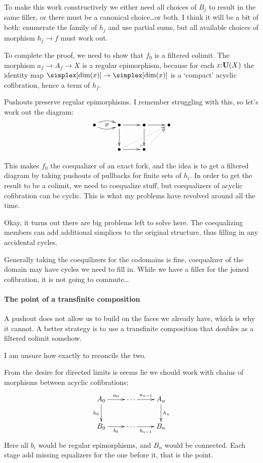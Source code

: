 \documentclass[csh.tex]{subfiles}
\makeatletter
\newcommand\pushout{\ar@{}[dr]|(.9)\ulcorner}
\makeatother
\begin{document}
To make this work constructively we either need all choices of $B_j$ to result in the same filler, or there must be a canonical choice\dots or both. I think it will be a bit of both: enumerate the family of $h_j$ and use partial sums, but all available choices of morphism $h_j\to f$ must work out.

To complete the proof, we need to show that $f_0$ is a filtered colimit. The morphism $a_f\to A_f\to X$ is a regular epimorphism, because for each $x\mathord :\mathbf{U}(X)$ the identity map $\simplex[\dim(x)]\to\simplex[\dim(x)]$ is a `compact' acyclic cofibration, hence a term of $h_f$.

Pushouts preserve regular epimorphisms. I remember struggling with this, so let's work out the diagram:
\[\xymatrix{
\bullet \ar@/^/[r]\ar@/_/[r]\ar@{}[r]|\varnothing & \bullet \ar[r]\ar[d]\pushout & \bullet \ar[r]\ar[d] & \bullet \\
& \bullet \ar[r]\ar@{.>}[urr] & \bullet \ar@{.>}[ur]
}\]

This makes $f_0$ the coequalizer of an exact fork, and the idea is to get a filtered diagram by taking pushouts of pullbacks for finite sets of $h_i$. In order to get the result to be a colimit, we need to coequalize stuff, but coequalizers of acyclic cofibration can be cyclic. This is what my problems have revolved around all the time.

Okay, it turns out there are big problems left to solve here.
The coequalizing members can add additional simplices to the original structure, thus filling in any accidental cycles.

Generally taking the coequilizers for the codomains is fine. coequalizer of the domain may have cycles we need to fill in. While we have a filler for the joined cofibration, it is not going to commute\dots

\paragraph{The point of a transfinite composition}
A pushout does not allow us to build on the faces we already have, which is why it cannot. A better strategy is to use a transfinite composition that doubles as a filtered colimit somehow.

I am unsure how exactly to reconcile the two.

From the desire for directed limits is seems lie we should work with chains of morphisms between acyclic cofibrations:
\[\xymatrix{
A_0 \ar[r]^{a_0}\ar[d]_{h_0} & \cdots\ar[r]^{a_{n-1}} & A_n\ar[d]^{h_n} \\
B_0 \ar[r]_{b_0} & \cdots \ar[r]_{b_{n-1}} & B_n 
}\]
Here all $b_i$ would be regular epimorphisms, and $B_n$ would be connected. Each stage add missing equalizers for the one before it, that is the point.
\end{document}
